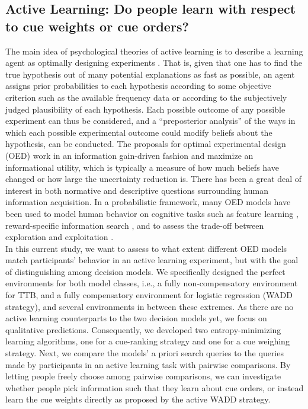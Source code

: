 \documentclass[10pt,letterpaper]{article}
\begin{document}
\subsection{Active Learning: Do people learn with respect to cue weights or cue orders?}
The main idea of psychological theories of active learning is to describe a learning agent as optimally designing experiments \citep{chaloner1989optimal}. That is, given that one has to find the true hypothesis out of many potential explanations as fast as possible, an agent assigns prior probabilities to each hypothesis according to some objective criterion such as the available frequency data or according to the subjectively judged plausibility of each hypothesis. Each possible outcome of any possible experiment can thus be considered, and a ``preposterior analysis'' \citep{raiffaapplied} of the ways in which each possible experimental outcome could modify beliefs about the hypothesis, can be conducted. The proposals for optimal experimental design (OED) work in an information gain-driven fashion and maximize an informational utility, which is typically a measure of how much beliefs have changed or how large the uncertainty reduction is. There has been a great deal of interest in both normative and descriptive questions surrounding human information acquisition. In a probabilistic framework, many OED models have been used to model human behavior on cognitive tasks such as feature learning \citep{griffiths2009analyzing}, reward-specific information search \citep{meder2012information}, and to assess the trade-off between exploration and exploitation \citep{knox2011nature}.\\
In this current study, we want to assess to what extent different OED models match participants' behavior in an active learning experiment, but with the goal of distinguishing among decision models. We specifically designed the perfect environments for both model classes, i.e., a fully non-compensatory environment for TTB, and a fully compensatory environment for logistic regression (WADD strategy), and several environments in between these extremes. As there are no active learning counterparts to the two decision models yet, we focus on qualitative predictions. Consequently, we developed two entropy-minimizing learning algorithms, one for a cue-ranking strategy and one for a cue weighing strategy. Next, we compare the models' a priori search queries to the queries made by participants in an active learning task with pairwise comparisons. By letting people freely choose among pairwise comparisons, we can investigate whether people pick information such that they learn about cue orders, or instead learn the cue weights directly as proposed by the active WADD strategy.
\end{document}
